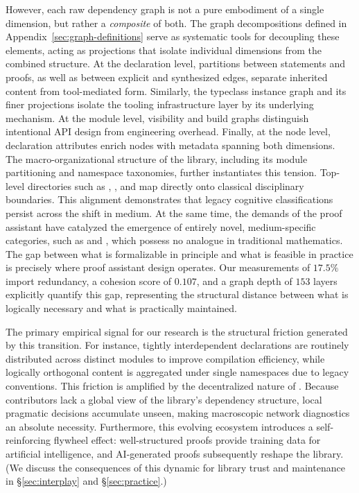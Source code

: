 However, each raw dependency graph is not a pure embodiment of a single dimension, but rather a \emph{composite} of both. The graph decompositions defined in Appendix~\ref{sec:graph-definitions} serve as systematic tools for decoupling these elements, acting as projections that isolate individual dimensions from the combined structure. At the declaration level, partitions between statements and proofs, as well as between explicit and synthesized edges, separate inherited content from tool-mediated form. Similarly, the typeclass instance graph and its finer projections isolate the tooling infrastructure layer by its underlying mechanism. At the module level, visibility and build graphs distinguish intentional API design from engineering overhead. Finally, at the node level, declaration attributes enrich nodes with metadata spanning both dimensions.
The macro-organizational structure of the library, including its module partitioning and namespace taxonomies, further instantiates this tension. Top-level directories such as , , and  map directly onto classical disciplinary boundaries. This alignment demonstrates that legacy cognitive classifications persist across the shift in medium. At the same time, the demands of the proof assistant have catalyzed the emergence of entirely novel, medium-specific categories, such as  and , which possess no analogue in traditional mathematics. The gap between what is formalizable in principle and what is feasible in practice is precisely where proof assistant design operates. Our measurements of $17.5\%$ import redundancy, a cohesion score of $0.107$, and a graph depth of $153$ layers explicitly quantify this gap, representing the structural distance between what is logically necessary and what is practically maintained.

The primary empirical signal for our research is the structural friction generated by this transition. For instance, tightly interdependent declarations are routinely distributed across distinct modules to improve compilation efficiency, while logically orthogonal content is aggregated under single namespaces due to legacy conventions. This friction is amplified by the decentralized nature of . Because contributors lack a global view of the library's dependency structure, local pragmatic decisions accumulate unseen, making macroscopic network diagnostics an absolute necessity. Furthermore, this evolving ecosystem introduces a self-reinforcing flywheel effect: well-structured proofs provide training data for artificial intelligence, and AI-generated proofs subsequently reshape the library. (We discuss the consequences of this dynamic for library trust and maintenance in \S\ref{sec:interplay} and \S\ref{sec:practice}.)

